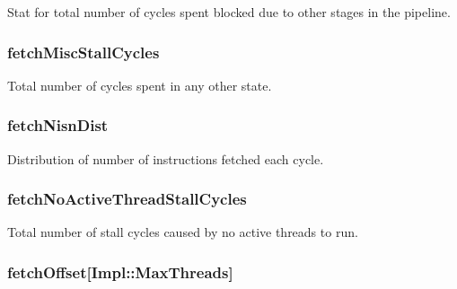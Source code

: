 \label{classDefaultFetch_a8af716ad2a53a409640347226078591c}
Stat for total number of cycles spent blocked due to other stages in the pipeline. \hypertarget{classDefaultFetch_a0a77b8544fea92003669cdc78a46eea5}{
\subsubsection[{fetchMiscStallCycles}]{ {\bf fetchMiscStallCycles}}}
\label{classDefaultFetch_a0a77b8544fea92003669cdc78a46eea5}
Total number of cycles spent in any other state. \hypertarget{classDefaultFetch_a4793a4a8857c13e7812b1c37c6df761b}{
\subsubsection[{fetchNisnDist}]{ {\bf fetchNisnDist}}}
\label{classDefaultFetch_a4793a4a8857c13e7812b1c37c6df761b}
Distribution of number of instructions fetched each cycle. \hypertarget{classDefaultFetch_aaa3b110a1f8e4fb7c88676a2ee836a06}{
\subsubsection[{fetchNoActiveThreadStallCycles}]{ {\bf fetchNoActiveThreadStallCycles}}}
\label{classDefaultFetch_aaa3b110a1f8e4fb7c88676a2ee836a06}
Total number of stall cycles caused by no active threads to run. \hypertarget{classDefaultFetch_afc52fdca94918eaaf908094a80ab63ce}{
\subsubsection[{fetchOffset}]{ {\bf fetchOffset}\mbox{[}Impl::MaxThreads\mbox{]}}}
